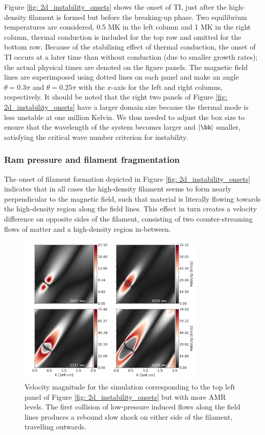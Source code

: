 Figure \ref{fig: 2d_instability_onsets} shows the onset of TI, just after the high-density filament is formed but before the breaking-up phase. Two equilibrium temperatures are considered, 0.5 MK in the left column and 1 MK in the right column, thermal conduction is included for the top row and omitted for the bottom row. Because of the stabilising effect of thermal conduction, the onset of TI occurs at a later time than without conduction (due to smaller growth rates); the actual physical times are denoted on the figure panels. The magnetic field lines are superimposed using dotted lines on each panel and make an angle $\theta = 0.3\pi$ and $\theta = 0.25\pi$ with the $x$-axis for the left and right columns, respectively. It should be noted that the right two panels of Figure \ref{fig: 2d_instability_onsets} have a larger domain size because the thermal mode is less unstable at one million Kelvin. We thus needed to adjust the box size to ensure that the wavelength of the system becomes larger and $|\bk|$ smaller, satisfying the critical wave number criterion for instability.

\subsubsection{Ram pressure and filament fragmentation}
The onset of filament formation depicted in Figure \ref{fig: 2d_instability_onsets} indicates that in all cases the high-density filament seems to form nearly perpendicular to the magnetic field, such that material is literally flowing towards the high-density region along the field lines. This effect in turn creates a velocity difference on opposite sides of the filament, consisting of two counter-streaming flows of matter and a high-density region in-between.

\begin{figure}[b]
  \centering
  \includegraphics[width=0.8\textwidth]{2d_velocity_plots.png}
  \caption{
    Velocity magnitude for the simulation corresponding to the top left panel of Figure \ref{fig: 2d_instability_onsets} but with more AMR levels. The first collision of low-pressure induced flows along the field lines produces a rebound slow shock on either side of the filament, travelling outwards.
  }
  \label{fig: 2d_velocity_plots}
\end{figure}

